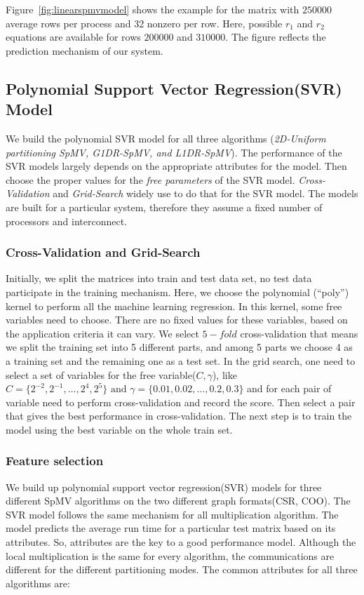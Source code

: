 \documentclass[sigconf,review,anonymous]{acmart}
\begin{document}
Figure~\ref{fig:linearspmvmodel} shows the example for the matrix with $250000$ average rows per process and 32 nonzero per row. 
Here, possible $r_1$ and $r_2$ equations are available for rows $200000$ and $310000$. The figure reflects the prediction mechanism of our 
system. 


\subsection{Polynomial Support Vector Regression(SVR) Model}
\label{sec:svr-spmv}
We build the polynomial SVR model for all three algorithms
(\textit{2D-Uniform partitioning SpMV, G1DR-SpMV, and L1DR-SpMV}). The
performance of the SVR models largely depends on the appropriate
attributes for the model. Then choose the proper values for the
\textit{free parameters} of the SVR model.  \textit{Cross-Validation}
and \textit{Grid-Search} widely use to do that for the SVR model. The
models are built for a particular system, therefore they assume a
fixed number of processors and interconnect.

\subsubsection{Cross-Validation and Grid-Search}
Initially, we split the matrices into train and test data set, no test
data participate in the training mechanism. Here, we choose the
polynomial (``poly'') kernel to perform all the machine learning
regression. In this kernel, some free variables need to choose. 
There are no fixed values for these variables, based on the
application criteria it can vary. We select $5-fold$ cross-validation
that means we split the training set into 5 different parts, and among
5 parts we choose 4 as a training set and the remaining one as a test
set. In the grid search, one need to select a set of variables for the
free variable($C,\gamma$), like $C=\{2^{-2},
2^{-1}, \dots, 2^4, 2^5\}\text{ and }\gamma=\{0.01, 0.02, \dots, 0.2, 0.3\}$
and for each pair of variable need to perform cross-validation and
record the score. Then select a pair that gives the best performance
in cross-validation.  The next step is to train the model using the best
variable on the whole train set.

\subsubsection{Feature selection}
We build up polynomial support vector regression(SVR) models for three
different SpMV algorithms on the two different graph formats(CSR,
COO).  The SVR model follows the same mechanism for all multiplication
algorithm. The model predicts the average run time for a particular
test matrix based on its attributes. So, attributes are the key to a
good performance model.  Although the local multiplication is the same
for every algorithm, the communications are different for the
different partitioning modes. The common attributes for all three
algorithms are:
\end{document}
